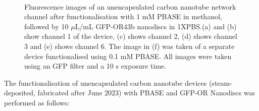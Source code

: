 \documentclass[
  a4paper,
]{scrbook}
\begin{document}
\begin{figure}
\begin{minipage}[t]{0.47\linewidth}
{}

\subcaption{\label{fig-PBASE-GFP-OR-ch6}}
\end{minipage}%
%
\begin{minipage}[t]{0.05\linewidth}

{\centering 

~

}

\end{minipage}%
%
\begin{minipage}[t]{0.47\linewidth}

{\centering 


}

\subcaption{\label{fig-PBASE-GFP-OR-0.1mM}}
\end{minipage}%

\caption{\label{fig-PBASE-GFP-ORs}Fluorescence images of an
unencapsulated carbon nanotube network channel after functionalisation
with 1 mM PBASE in methanol, followed by 10 \(\mu\)L/mL GFP-OR43b
nanodiscs in 1XPBS.(a) and (b) show channel 1 of the device, (c) shows
channel 2, (d) shows channel 3 and (e) shows channel 6. The image in (f)
was taken of a separate device functionalised using 0.1 mM PBASE. All
images were taken using an GFP filter and a 10 s exposure time.}

\end{figure}

The functionalisation of unencapsulated carbon nanotube devices
(steam-deposited, fabricated after June 2023) with PBASE and GFP-OR
Nanodiscs was performed as follows:
\end{document}
